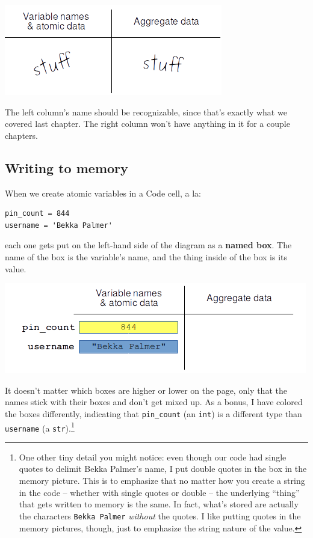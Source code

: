 \begin{center}
\includegraphics[width=.7\textwidth]{memoryPicture.png}
\label{fig:memoryPicture}
\end{center}

The left column's name should be recognizable, since that's exactly what we
covered last chapter. The right column won't have anything in it for a couple
chapters.

\subsection{Writing to memory}

When we create atomic variables in a Code cell, a la:

\begin{Verbatim}[fontsize=\small,samepage=true,frame=single,framesep=3mm]
pin_count = 844
username = 'Bekka Palmer'
\end{Verbatim}

each one gets put on the left-hand side of the diagram as a \textbf{named box}.
The name of the box is the variable's name, and the thing inside of the box is
its value.

\vspace{-.2in}
\begin{center}
\includegraphics[width=.8\textwidth]{memoryPicture2.png}
\end{center}

It doesn't matter which boxes are higher or lower on the page, only that the
names stick with their boxes and don't get mixed up. As a bonus, I have colored
the boxes differently, indicating that \texttt{pin\_count} (an \texttt{int}) is
a different type than \texttt{username} (a \texttt{str}).\footnote{One other
tiny detail you might notice: even though our code had single quotes to delimit
Bekka Palmer's name, I put double quotes in the box in the memory picture. This
is to emphasize that no matter how you create a string in the code -- whether
with single quotes or double -- the underlying ``thing'' that gets written to
memory is the same. In fact, what's stored are actually the characters
\texttt{Bekka Palmer} \textit{without} the quotes. I like putting quotes in the
memory pictures, though, just to emphasize the string nature of the value.}

